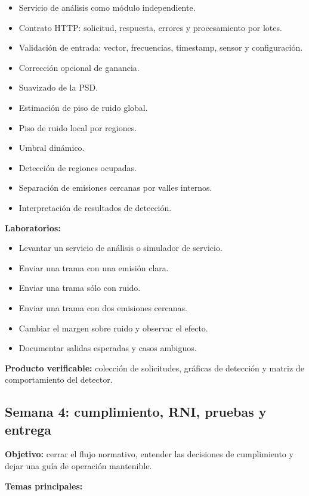 \documentclass[11pt,a4paper]{article}
\newcommand{\producto}{\textbf{Producto verificable:} }
\begin{document}
\begin{itemize}
  \item Servicio de análisis como módulo independiente.
  \item Contrato HTTP: solicitud, respuesta, errores y procesamiento por lotes.
  \item Validación de entrada: vector, frecuencias, timestamp, sensor y configuración.
  \item Corrección opcional de ganancia.
  \item Suavizado de la PSD.
  \item Estimación de piso de ruido global.
  \item Piso de ruido local por regiones.
  \item Umbral dinámico.
  \item Detección de regiones ocupadas.
  \item Separación de emisiones cercanas por valles internos.
  \item Interpretación de resultados de detección.
\end{itemize}

\textbf{Laboratorios:}

\begin{itemize}
  \item Levantar un servicio de análisis o simulador de servicio.
  \item Enviar una trama con una emisión clara.
  \item Enviar una trama sólo con ruido.
  \item Enviar una trama con dos emisiones cercanas.
  \item Cambiar el margen sobre ruido y observar el efecto.
  \item Documentar salidas esperadas y casos ambiguos.
\end{itemize}

\producto colección de solicitudes, gráficas de detección y matriz de comportamiento del detector.

\subsection*{Semana 4: cumplimiento, RNI, pruebas y entrega}

\textbf{Objetivo:} cerrar el flujo normativo, entender las decisiones de cumplimiento y dejar una guía de operación mantenible.

\textbf{Temas principales:}
\end{document}
